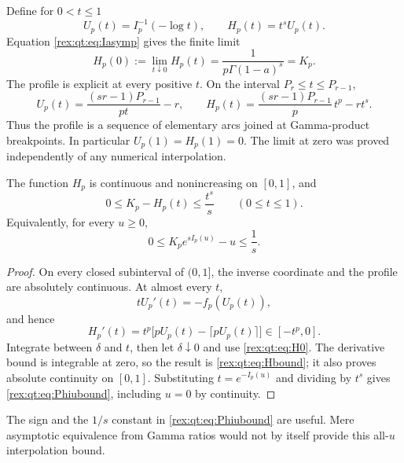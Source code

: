 Define for $0<t\le1$
\begin{equation}\label{rex:qt:eq:UH}
 U_p(t)=I_p^{-1}(-\log t),\qquad H_p(t)=t^sU_p(t).
\end{equation}
Equation \eqref{rex:qt:eq:Iasymp} gives the finite limit
\begin{equation}\label{rex:qt:eq:H0}
 H_p(0):=\lim_{t\downarrow0}H_p(t)
       =\frac1{p\Gamma(1-a)^s}=K_p.
\end{equation}
The profile is explicit at every positive $t$. On the interval $P_r\le t\le P_{r-1}$,
\begin{equation}\label{rex:qt:eq:Uexplicit}
 U_p(t)=\frac{(sr-1)P_{r-1}}{pt}-r,\qquad
 H_p(t)=\frac{(sr-1)P_{r-1}}p\,t^p-r t^s.
\end{equation}
Thus the profile is a sequence of elementary arcs joined at Gamma-product breakpoints. In particular $U_p(1)=H_p(1)=0$. The limit at zero was proved independently of any numerical interpolation.

\begin{proposition}\label{rex:qt:prop:profilebound}
The function $H_p$ is continuous and nonincreasing on $[0,1]$, and
\begin{equation}\label{rex:qt:eq:Hbound}
 0\le K_p-H_p(t)\le\frac{t^s}{s}\qquad(0\le t\le1).
\end{equation}
Equivalently, for every $u\ge0$,
\begin{equation}\label{rex:qt:eq:Phiubound}
 0\le K_p e^{sI_p(u)}-u\le\frac1s.
\end{equation}
\end{proposition}
\begin{proof}
On every closed subinterval of $(0,1]$, the inverse coordinate and the profile are absolutely continuous. At almost every $t$,
\[
 tU_p'(t)=-f_p(U_p(t)),
\]
and hence
\begin{equation}\label{rex:qt:eq:Hderivative}
 H_p'(t)=t^p\bigl[pU_p(t)-\lceil pU_p(t)\rceil\bigr]
            \in[-t^p,0].
\end{equation}
Integrate between $\delta$ and $t$, then let $\delta\downarrow0$ and use \eqref{rex:qt:eq:H0}. The derivative bound is integrable at zero, so the result is \eqref{rex:qt:eq:Hbound}; it also proves absolute continuity on $[0,1]$. Substituting $t=e^{-I_p(u)}$ and dividing by $t^s$ gives \eqref{rex:qt:eq:Phiubound}, including $u=0$ by continuity.
\end{proof}

The sign and the $1/s$ constant in \eqref{rex:qt:eq:Phiubound} are useful. Mere asymptotic equivalence from Gamma ratios would not by itself provide this all-$u$ interpolation bound.

